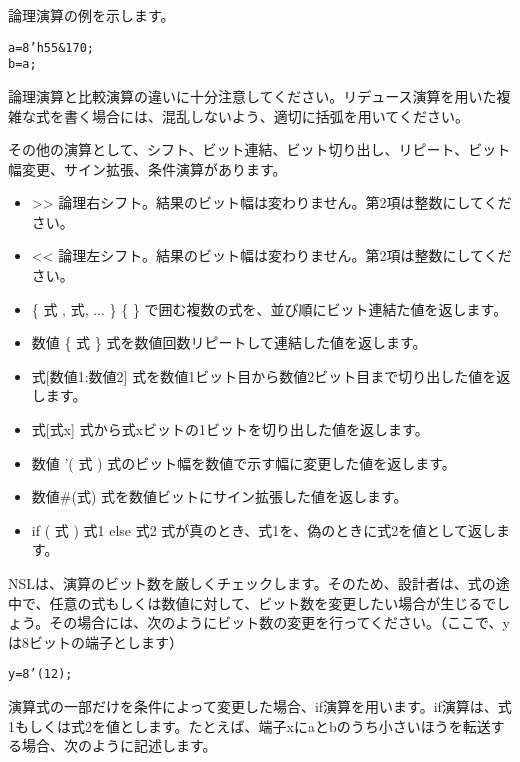 論理演算の例を示します。

\begin{reviewemlist}
\begin{alltt}
   a = 8'h55 \& 170;
   b = \textbar{}a;
\end{alltt}
\end{reviewemlist}

論理演算と比較演算の違いに十分注意してください。リデュース演算を用いた複雑な式を書く場合には、混乱しないよう、適切に括弧を用いてください。

その他の演算として、シフト、ビット連結、ビット切り出し、リピート、ビット幅変更、サイン拡張、条件演算があります。

\begin{itemize}
\item \textgreater{}\textgreater{}        論理右シフト。結果のビット幅は変わりません。第2項は整数にしてください。
\item \textless{}\textless{}        論理左シフト。結果のビット幅は変わりません。第2項は整数にしてください。
\item \{ 式 , 式, ... \}        \{ \} で囲む複数の式を、並び順にビット連結た値を返します。
\item 数値 \{ 式 \}        式を数値回数リピートして連結した値を返します。
\item 式[数値1:数値2]   式を数値1ビット目から数値2ビット目まで切り出した値を返します。
\item 式[式x]        	式から式xビットの1ビットを切り出した値を返します。
\item 数値 '( 式 )       式のビット幅を数値で示す幅に変更した値を返します。
\item 数値\#(式)        	式を数値ビットにサイン拡張した値を返します。
\item if ( 式 ) 式1 else 式2        式が真のとき、式1を、偽のときに式2を値として返します。
\end{itemize}

NSLは、演算のビット数を厳しくチェックします。そのため、設計者は、式の途中で、任意の式もしくは数値に対して、ビット数を変更したい場合が生じるでしょう。その場合には、次のようにビット数の変更を行ってください。（ここで、yは8ビットの端子とします）

\begin{reviewemlist}
\begin{alltt}
       y = 8'(12);
\end{alltt}
\end{reviewemlist}

演算式の一部だけを条件によって変更した場合、if演算を用います。if演算は、式1もしくは式2を値とします。たとえば、端子xにaとbのうち小さいほうを転送する場合、次のように記述します。

